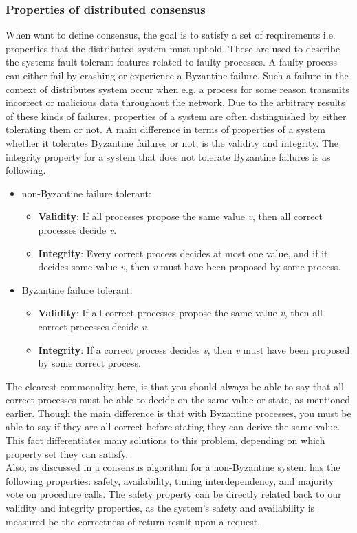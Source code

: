 \subsubsection{Properties of distributed consensus}
When want to define consensus, the goal is to satisfy a set of requirements i.e. properties that the distributed system must uphold. These are used to describe the systems fault tolerant features related to faulty processes. A faulty process can either fail by crashing or experience a Byzantine failure. Such a failure in the context of distributes system occur when e.g. a process for some reason transmits incorrect or malicious data throughout the network. Due to the arbitrary results of these kinds of failures, properties of a system are often distinguished by either tolerating them or not. A main difference in terms of properties of a system whether it tolerates Byzantine failures or not, is the validity and integrity. The integrity property for a system that does not tolerate Byzantine failures is as following\cite{DistributedSystems}.

\begin{itemize}
\item non-Byzantine failure tolerant:
	\begin{itemize}
	\item \textbf{Validity}: If all processes propose the same value \textit{v}, then all correct processes decide \textit{v}.
	\item \textbf{Integrity}: Every correct process decides at most one value, and if it decides some value \textit{v}, then \textit{v} must have been proposed by some process.
	\end{itemize}
\item Byzantine failure tolerant:
	\begin{itemize}
	\item \textbf{Validity}: If all correct processes propose the same value \textit{v}, then all correct processes decide \textit{v}.
	\item \textbf{Integrity}: If a correct process decides \textit{v}, then \textit{v} must have been proposed by some correct process.
	\end{itemize}
\end{itemize}

The clearest commonality here, is that you should always be able to say that all correct processes must be able to decide on the same value or state, as mentioned earlier. Though the main difference is that with Byzantine processes, you must be able to say if they are all correct before stating they can derive the same value. This fact differentiates many solutions to this problem, depending on which property set they can satisfy. \\
Also, as discussed in \cite{Raft} a consensus algorithm for a non-Byzantine system has the following properties: safety, availability, timing interdependency, and majority vote on procedure calls. The safety property can be directly related back to our validity and integrity properties, as the system's safety and availability is measured be the correctness of return result upon a request.

